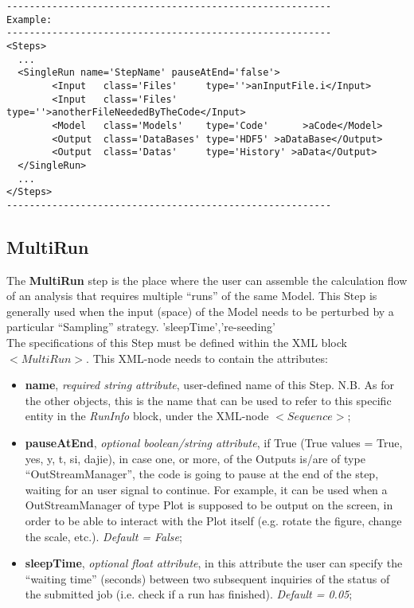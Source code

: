 \begin{lstlisting}[style=XML]
---------------------------------------------------------
Example:
---------------------------------------------------------
<Steps>
  ...
  <SingleRun name='StepName' pauseAtEnd='false'> 
        <Input   class='Files'     type=''>anInputFile.i</Input>
        <Input   class='Files'     type=''>anotherFileNeededByTheCode</Input>
        <Model   class='Models'    type='Code'      >aCode</Model>
        <Output  class='DataBases' type='HDF5' >aDataBase</Output>
        <Output  class='Datas'     type='History' >aData</Output>
  </SingleRun>
  ...
</Steps>
---------------------------------------------------------
\end{lstlisting}
\subsection{MultiRun}
\label{subsec:stepMultiRun}
The  \textbf{MultiRun} step is the place where the user can assemble the calculation flow of an analysis that  requires multiple ``runs'' of the same Model. This Step is generally used when the input (space) of the Model needs to be perturbed by a particular ``Sampling'' strategy.
'sleepTime','re-seeding'
\\ The specifications of this Step must be defined within the XML block $<MultiRun>$. This XML-node needs to contain the attributes:
\vspace{-5mm}
\begin{itemize}
\itemsep0em
\item \textbf{name}, \textit{required string attribute}, user-defined name of this Step. N.B. As for the other objects, this is the name that can be used to refer to this specific entity in the \textit{RunInfo} block, under the XML-node $<Sequence>$;
\item \textbf{pauseAtEnd}, \textit{optional boolean/string attribute}, if True (True values = True, yes, y, t, si, dajie), in case one, or more, of the Outputs is/are of type ``OutStreamManager'', the code is going to pause at the end of the step, waiting for an user signal to continue. For example, it can be used when a OutStreamManager of type Plot is supposed to be output on the screen, in order to be able to interact with the Plot itself (e.g. rotate the figure, change the scale, etc.).  \textit{Default = False};
\item \textbf{sleepTime}, \textit{optional float attribute}, in this attribute the user can specify the ``waiting time'' (seconds) between two subsequent  inquiries of the status of the submitted job (i.e. check if a run has finished).  \textit{Default = 0.05};
\end{itemize}
